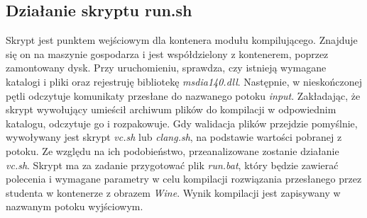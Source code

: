 \subsection{Działanie skryptu run.sh}
Skrypt jest punktem wejściowym dla kontenera modułu kompilującego. Znajduje się on na maszynie gospodarza i jest współdzielony z kontenerem, poprzez zamontowany dysk. Przy uruchomieniu, sprawdza, czy istnieją wymagane katalogi i pliki oraz rejestruję bibliotekę \textit{msdia140.dll}. Następnie, w nieskończonej pętli odczytuje komunikaty przesłane do nazwanego potoku \textit{input}. Zakładając, że skrypt wywołujący umieścił archiwum plików do kompilacji w odpowiednim katalogu, odczytuje go i rozpakowuje. Gdy walidacja plików przejdzie pomyślnie, wywoływany jest skrypt \textit{vc.sh} lub \textit{clang.sh}, na podstawie wartości pobranej z potoku. Ze względu na ich podobieństwo, przeanalizowane zostanie działanie \textit{vc.sh}. Skrypt ma za zadanie przygotować plik \textit{run.bat}, który będzie zawierać polecenia i wymagane parametry w celu kompilacji rozwiązania przesłanego przez studenta w kontenerze z obrazem \textit{Wine}. Wynik kompilacji jest zapisywany w nazwanym potoku wyjściowym.

